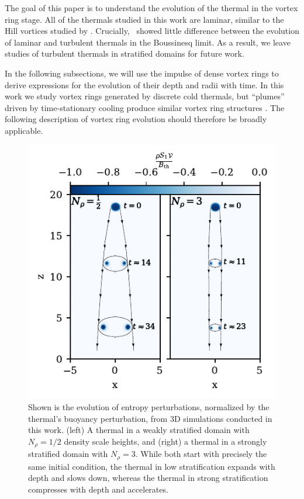 The goal of this paper is to understand the evolution of the thermal in the vortex ring stage.
All of the thermals studied in this work are laminar, similar to the Hill vortices studied by \cite{brandenburg2016}.
Crucially, \LJ\, showed little difference between the evolution of laminar and turbulent thermals in the Boussinesq limit.
As a result, we leave studies of turbulent thermals in stratified domains for future work.

In the following subsections, we will use the impulse of dense vortex rings to derive expressions for the evolution of their depth and radii with time.
In this work we study vortex rings generated by discrete cold thermals, but ``plumes'' driven by time-stationary cooling produce similar vortex ring structures \cite[as in e.g.,][]{rast1998}.
The following description of vortex ring evolution should therefore be broadly applicable.

\begin{figure}[p!]
    \includegraphics[width=\columnwidth]{./figs/evolution_colormeshes.pdf}
    \caption[Pictoral description of the evolution of thermals as density stratification increases]
	{
	Shown is the evolution of entropy perturbations, normalized by the thermal's buoyancy perturbation, from 3D simulations conducted in this work.
	(left) A thermal in a weakly stratified domain with $N_\rho = 1/2$ density scale heights, and (right) a thermal in a strongly stratified domain with $N_\rho = 3$.
	While both start with precisely the same initial condition, the thermal in low stratification expands with depth and slows down, whereas the thermal in strong stratification compresses with depth and accelerates.
    \label{fig:evolution_colormeshes} }
\end{figure}


